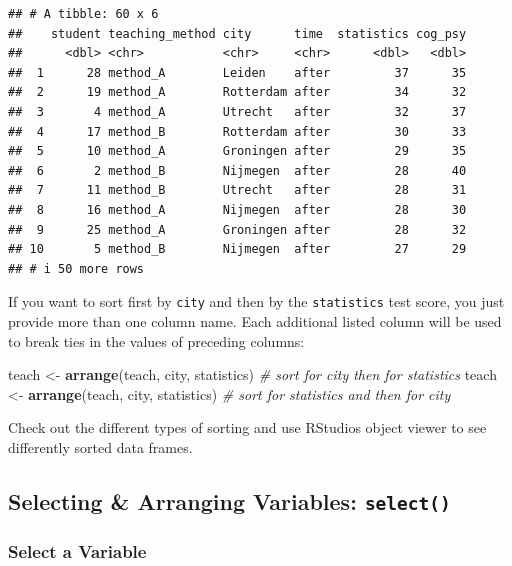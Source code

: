 \documentclass[
]{scrartcl}
\makeatletter
\newenvironment{Shaded}{\begin{snugshade}}{\end{snugshade}}
\newcommand{\CommentTok}[1]{\textcolor[rgb]{0.56,0.35,0.01}{\textit{#1}}}
\newcommand{\FunctionTok}[1]{\textcolor[rgb]{0.13,0.29,0.53}{\textbf{#1}}}
\newcommand{\NormalTok}[1]{#1}
\newcommand{\OtherTok}[1]{\textcolor[rgb]{0.56,0.35,0.01}{#1}}
\newenvironment{kframe}{%
\medskip{}
\setlength{\fboxsep}{.8em}
 \def\at@end@of@kframe{}%
 \ifinner\ifhmode%
  \def\at@end@of@kframe{\end{minipage}}%
  \begin{minipage}{\columnwidth}%
 \fi\fi%
 \def\FrameCommand##1{\hskip\@totalleftmargin \hskip-\fboxsep
 \colorbox{shadecolor}{##1}\hskip-\fboxsep
     \hskip-\linewidth \hskip-\@totalleftmargin \hskip\columnwidth}%
 \MakeFramed {\advance\hsize-\width
   \@totalleftmargin\z@ \linewidth\hsize
   \@setminipage}}%
 {\par\unskip\endMakeFramed%
 \at@end@of@kframe}
\newenvironment{rmdblock}[1]
  {
  \begin{itemize}
  \renewcommand{\labelitemi}{
    \raisebox{-.7\height}[0pt][0pt]{
      {\setkeys{Gin}{width=3em,keepaspectratio}\texttt{[image: images/\#1]}}
    }
  }
  \setlength{\fboxsep}{1em}
  \begin{kframe}
  \item
  }
  {
  \end{kframe}
  \end{itemize}
  }
\newenvironment{myexercise}
    {\begin{rmdblock}{exercise_green}}
    {\end{rmdblock}}
\makeatother
\begin{document}
\begin{verbatim}
## # A tibble: 60 x 6
##    student teaching_method city      time  statistics cog_psy
##      <dbl> <chr>           <chr>     <chr>      <dbl>   <dbl>
##  1      28 method_A        Leiden    after         37      35
##  2      19 method_A        Rotterdam after         34      32
##  3       4 method_A        Utrecht   after         32      37
##  4      17 method_B        Rotterdam after         30      33
##  5      10 method_A        Groningen after         29      35
##  6       2 method_B        Nijmegen  after         28      40
##  7      11 method_B        Utrecht   after         28      31
##  8      16 method_A        Nijmegen  after         28      30
##  9      25 method_A        Groningen after         28      32
## 10       5 method_B        Nijmegen  after         27      29
## # i 50 more rows
\end{verbatim}

If you want to sort first by \texttt{city} and then by the \texttt{statistics} test score, you just provide more than one column name. Each additional listed column will be used to break ties in the values of preceding columns:

\begin{Shaded}
\begin{Highlighting}[]
\NormalTok{teach }\OtherTok{\textless{}{-}} \FunctionTok{arrange}\NormalTok{(teach, city, statistics) }\CommentTok{\# sort for city then for statistics}
\NormalTok{teach }\OtherTok{\textless{}{-}} \FunctionTok{arrange}\NormalTok{(teach, city, statistics) }\CommentTok{\# sort for statistics and then for city}
\end{Highlighting}
\end{Shaded}

\begin{myexercise}
Check out the different types of sorting and use RStudios object viewer
to see differently sorted data frames.
\end{myexercise}

\subsection{\texorpdfstring{Selecting \& Arranging Variables: \texttt{select()}}{Selecting \& Arranging Variables: select()}}\label{selecting-arranging-variables-select}

\subsubsection{Select a Variable}\label{select-a-variable}
\end{document}
